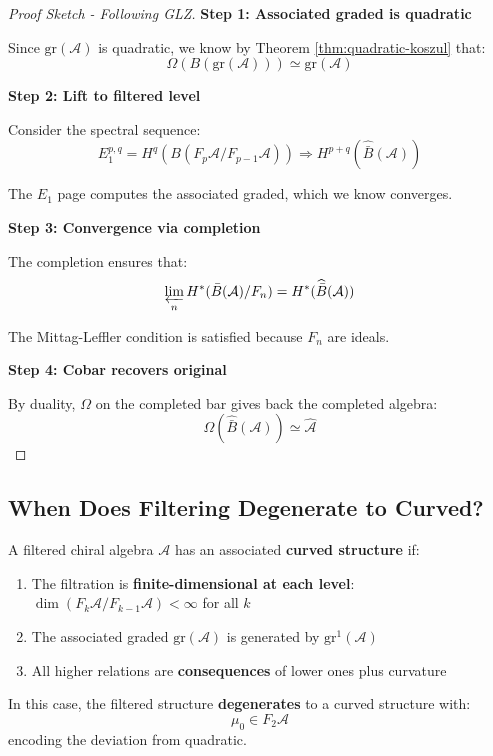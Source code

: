 \begin{proof}[Proof Sketch - Following GLZ]

\textbf{Step 1: Associated graded is quadratic}

Since $\text{gr}(\mathcal{A})$ is quadratic, we know by Theorem \ref{thm:quadratic-koszul} that:
$$\Omega(B(\text{gr}(\mathcal{A}))) \simeq \text{gr}(\mathcal{A})$$

\textbf{Step 2: Lift to filtered level}

Consider the spectral sequence:
$$E_1^{p,q} = H^q(B(F_p\mathcal{A}/F_{p-1}\mathcal{A})) \Rightarrow H^{p+q}(\widehat{\bar{B}}(\mathcal{A}))$$

The $E_1$ page computes the associated graded, which we know converges.

\textbf{Step 3: Convergence via completion}

The completion ensures that:
$$\varprojlim_n H^*(\bar{B}(\mathcal{A})/F_n) = H^*(\widehat{\bar{B}}(\mathcal{A}))$$

The Mittag-Leffler condition is satisfied because $F_n$ are ideals.

\textbf{Step 4: Cobar recovers original}

By duality, $\Omega$ on the completed bar gives back the completed algebra:
$$\Omega(\widehat{\bar{B}}(\mathcal{A})) \simeq \widehat{\mathcal{A}}$$

\end{proof}

\subsection{When Does Filtering Degenerate to Curved?}

\begin{proposition}\label{prop:filtered-to-curved}
A filtered chiral algebra $\mathcal{A}$ has an associated \textbf{curved structure} if:
\begin{enumerate}
\item The filtration is \textbf{finite-dimensional at each level}: 
$\dim(F_k\mathcal{A}/F_{k-1}\mathcal{A}) < \infty$ for all $k$
\item The associated graded $\text{gr}(\mathcal{A})$ is generated by $\text{gr}^1(\mathcal{A})$
\item All higher relations are \textbf{consequences} of lower ones plus curvature
\end{enumerate}

In this case, the filtered structure \textbf{degenerates} to a curved structure with:
$$\mu_0 \in F_2\mathcal{A}$$
encoding the deviation from quadratic.
\end{proposition}

